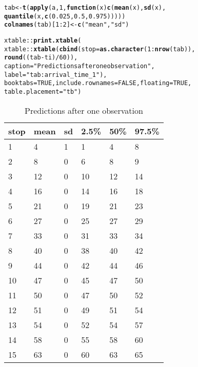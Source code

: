 \documentclass[11pt]{article}\usepackage[]{graphicx}\usepackage[]{color}
\makeatletter
\newcommand{\hlnum}[1]{\textcolor[rgb]{0.686,0.059,0.569}{#1}}%
\newcommand{\hlstr}[1]{\textcolor[rgb]{0.192,0.494,0.8}{#1}}%
\newcommand{\hlopt}[1]{\textcolor[rgb]{0,0,0}{#1}}%
\newcommand{\hlstd}[1]{\textcolor[rgb]{0.345,0.345,0.345}{#1}}%
\newcommand{\hlkwa}[1]{\textcolor[rgb]{0.161,0.373,0.58}{\textbf{#1}}}%
\newcommand{\hlkwb}[1]{\textcolor[rgb]{0.69,0.353,0.396}{#1}}%
\newcommand{\hlkwc}[1]{\textcolor[rgb]{0.333,0.667,0.333}{#1}}%
\newcommand{\hlkwd}[1]{\textcolor[rgb]{0.737,0.353,0.396}{\textbf{#1}}}%
\newenvironment{kframe}{%
 \def\at@end@of@kframe{}%
 \ifinner\ifhmode%
  \def\at@end@of@kframe{\end{minipage}}%
  \begin{minipage}{\columnwidth}%
 \fi\fi%
 \def\FrameCommand##1{\hskip\@totalleftmargin \hskip-\fboxsep
 \colorbox{shadecolor}{##1}\hskip-\fboxsep
     \hskip-\linewidth \hskip-\@totalleftmargin \hskip\columnwidth}%
 \MakeFramed {\advance\hsize-\width
   \@totalleftmargin\z@ \linewidth\hsize
   \@setminipage}}%
 {\par\unskip\endMakeFramed%
 \at@end@of@kframe}
\makeatother
\begin{document}
\begin{kframe}
\begin{alltt}
\hlstd{tab} \hlkwb{<-} \hlkwd{t}\hlstd{(}\hlkwd{apply}\hlstd{(a,} \hlnum{1}\hlstd{,} \hlkwa{function}\hlstd{(}\hlkwc{x}\hlstd{)} \hlkwd{c}\hlstd{(}\hlkwd{mean}\hlstd{(x),} \hlkwd{sd}\hlstd{(x),}
                                   \hlkwd{quantile}\hlstd{(x,} \hlkwd{c}\hlstd{(}\hlnum{0.025}\hlstd{,} \hlnum{0.5}\hlstd{,} \hlnum{0.975}\hlstd{)))))}
\hlkwd{colnames}\hlstd{(tab)[}\hlnum{1}\hlopt{:}\hlnum{2}\hlstd{]} \hlkwb{<-} \hlkwd{c}\hlstd{(}\hlstr{"mean"}\hlstd{,} \hlstr{"sd"}\hlstd{)}

\hlstd{xtable}\hlopt{::}\hlkwd{print.xtable}\hlstd{(}
    \hlstd{xtable}\hlopt{::}\hlkwd{xtable}\hlstd{(}\hlkwd{cbind}\hlstd{(}\hlkwc{stop} \hlstd{=} \hlkwd{as.character}\hlstd{(}\hlnum{1}\hlopt{:}\hlkwd{nrow}\hlstd{(tab)),}
                         \hlkwd{round}\hlstd{((tab} \hlopt{-} \hlstd{ti)} \hlopt{/} \hlnum{60}\hlstd{)),}
                   \hlkwc{caption} \hlstd{=} \hlstr{"Predictions after one observation"}\hlstd{,}
                   \hlkwc{label} \hlstd{=} \hlstr{"tab:arrival_time_1"}\hlstd{),}
    \hlkwc{booktabs} \hlstd{=} \hlnum{TRUE}\hlstd{,} \hlkwc{include.rownames} \hlstd{=} \hlnum{FALSE}\hlstd{,} \hlkwc{floating} \hlstd{=} \hlnum{TRUE}\hlstd{,}
    \hlkwc{table.placement} \hlstd{=} \hlstr{"tb"}\hlstd{)}
\end{alltt}
\end{kframe}%
\begin{table}[tb]
\centering
\begin{tabular}{llllll}
  \toprule
stop & mean & sd & 2.5\% & 50\% & 97.5\% \\ 
  \midrule
1 & 4 & 1 & 1 & 4 & 8 \\ 
  2 & 8 & 0 & 6 & 8 & 9 \\ 
  3 & 12 & 0 & 10 & 12 & 14 \\ 
  4 & 16 & 0 & 14 & 16 & 18 \\ 
  5 & 21 & 0 & 19 & 21 & 23 \\ 
  6 & 27 & 0 & 25 & 27 & 29 \\ 
  7 & 33 & 0 & 31 & 33 & 34 \\ 
  8 & 40 & 0 & 38 & 40 & 42 \\ 
  9 & 44 & 0 & 42 & 44 & 46 \\ 
  10 & 47 & 0 & 45 & 47 & 50 \\ 
  11 & 50 & 0 & 47 & 50 & 52 \\ 
  12 & 51 & 0 & 49 & 51 & 54 \\ 
  13 & 54 & 0 & 52 & 54 & 57 \\ 
  14 & 58 & 0 & 55 & 58 & 60 \\ 
  15 & 63 & 0 & 60 & 63 & 65 \\ 
   \bottomrule
\end{tabular}
\caption{Predictions after one observation} 
\label{tab:arrival_time_1}
\end{table}
\end{document}
